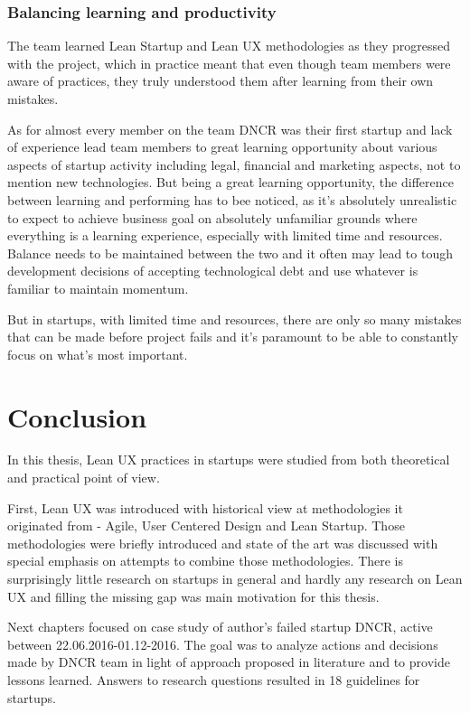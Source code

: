 \documentclass{article}
\begin{document}
\subsubsection{Balancing learning and productivity}
The team learned Lean Startup and Lean UX methodologies as they progressed with the project, which in practice meant that even though team members were aware of practices, they truly understood them after learning from their own mistakes.

As for almost every member on the team DNCR was their first startup and lack of experience lead team members to great learning opportunity about various aspects of startup activity including legal, financial and marketing aspects, not to mention new technologies. But being a great learning opportunity, the difference between learning and performing has to bee noticed, as it's absolutely unrealistic to expect to achieve business goal on absolutely unfamiliar grounds where everything is a learning experience, especially with limited time and resources. Balance needs to be maintained between the two and it often may lead to tough development decisions of accepting technological debt and use whatever is familiar to maintain momentum.

But in startups, with limited time and resources, there are only so many mistakes that can be made before project fails and it's paramount to be able to constantly focus on what's most important.

\section{Conclusion}
In this thesis, Lean UX practices in startups were studied from both theoretical and practical point of view.

First, Lean UX was introduced with historical view at methodologies it originated from - Agile, User Centered Design and Lean Startup. Those methodologies were briefly introduced and state of the art was discussed with special emphasis on attempts to combine those methodologies. There is surprisingly little research on startups in general and hardly any research on Lean UX and filling the missing gap was main motivation for this thesis.

Next chapters focused on case study of author's failed startup DNCR, active between 22.06.2016-01.12-2016. The goal was to analyze actions and decisions made by DNCR team in light of approach proposed in literature and to provide lessons learned. Answers to research questions resulted in 18 guidelines for startups.
\end{document}
